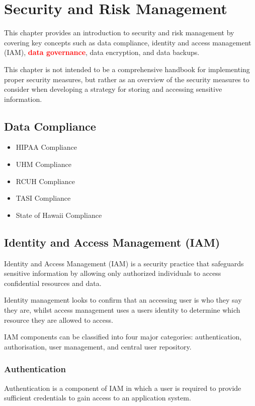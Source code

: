 \section{Security and Risk Management} \label{section: SARM}
This chapter provides an introduction to security and risk management by covering key concepts such as data compliance, identity and access management (IAM), \textcolor{red}{\textbf{data governance}}, data encryption, and data backups. 

This chapter is not intended to be a comprehensive handbook for implementing proper security measures, but rather as an overview of the security measures to consider when developing a strategy for storing and accessing sensitive information.

\subsection{Data Compliance}

\begin{itemize}
    \item HIPAA Compliance
    \item UHM Compliance
    \item RCUH Compliance
    \item TASI Compliance
    \item State of Hawaii Compliance
\end{itemize}

\subsection{Identity and Access Management (IAM)}
Identity and Access Management (IAM) is a security practice that safeguards sensitive information by allowing only authorized individuals to access confidential resources and data. 

Identity management looks to confirm that an accessing user is who they say they are, whilst access management uses a users identity to determine which resource they are allowed to access. 

IAM components can be classified into four major categories: authentication, authorisation, user management, and central user repository.

\subsubsection{Authentication}
Authentication is a component of IAM in which a user is required to provide sufficient credentials to gain access to an application system. 

